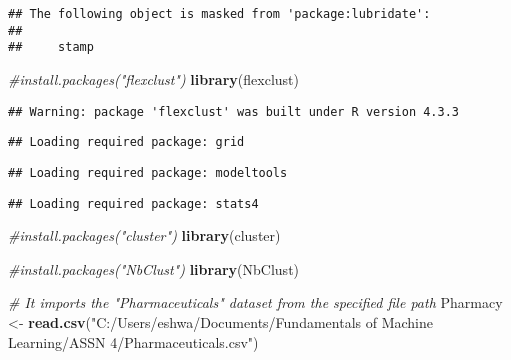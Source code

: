 \documentclass[
]{article}
\newenvironment{Shaded}{\begin{snugshade}}{\end{snugshade}}
\newcommand{\CommentTok}[1]{\textcolor[rgb]{0.56,0.35,0.01}{\textit{#1}}}
\newcommand{\FunctionTok}[1]{\textcolor[rgb]{0.13,0.29,0.53}{\textbf{#1}}}
\newcommand{\NormalTok}[1]{#1}
\newcommand{\OtherTok}[1]{\textcolor[rgb]{0.56,0.35,0.01}{#1}}
\newcommand{\StringTok}[1]{\textcolor[rgb]{0.31,0.60,0.02}{#1}}
\begin{document}
\begin{verbatim}
## The following object is masked from 'package:lubridate':
## 
##     stamp
\end{verbatim}

\begin{Shaded}
\begin{Highlighting}[]
\CommentTok{\#install.packages("flexclust")}
\FunctionTok{library}\NormalTok{(flexclust)}
\end{Highlighting}
\end{Shaded}

\begin{verbatim}
## Warning: package 'flexclust' was built under R version 4.3.3
\end{verbatim}

\begin{verbatim}
## Loading required package: grid
\end{verbatim}

\begin{verbatim}
## Loading required package: modeltools
\end{verbatim}

\begin{verbatim}
## Loading required package: stats4
\end{verbatim}

\begin{Shaded}
\begin{Highlighting}[]
\CommentTok{\#install.packages("cluster")}
\FunctionTok{library}\NormalTok{(cluster)}
\end{Highlighting}
\end{Shaded}

\begin{Shaded}
\begin{Highlighting}[]
\CommentTok{\#install.packages("NbClust")}
\FunctionTok{library}\NormalTok{(NbClust)}
\end{Highlighting}
\end{Shaded}

\begin{Shaded}
\begin{Highlighting}[]
\CommentTok{\# It imports the "Pharmaceuticals" dataset from the specified file path}
\NormalTok{Pharmacy }\OtherTok{\textless{}{-}} \FunctionTok{read.csv}\NormalTok{(}\StringTok{"C:/Users/eshwa/Documents/Fundamentals of Machine Learning/ASSN 4/Pharmaceuticals.csv"}\NormalTok{)}
\end{Highlighting}
\end{Shaded}
\end{document}
